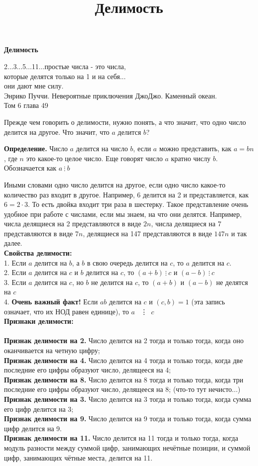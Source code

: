 \centerline{\bf \Huge Делимость}
\title{Делимость}
\begin{flushright}
    \scriptsize{2...3...5...11...простые числа - это числа,\\ которые делятся только на 1 и на себя... \\они дают мне силу.\\ Энрико Пуччи. Невероятные приключения ДжоДжо. Каменный океан.\\Том 6 глава 49}
\end{flushright}
Прежде чем говорить о делимости, нужно понять, а что значит, что одно число делится на другое. Что значит, что $a$ делится $b$? 

\textbf{Определение.} Число $a$ делится на число $b$, если $a$ можно представить, как $a=bn$, где $n$ это какое-то целое число. Еще говорят число $a$ кратно числу $b$. Обозначается как $a \ \vdots \ b$

Иными словами одно число делится на другое, если одно число какое-то количество раз входит в другое. Например, 6 делится на 2 и представляется, как $6 = 2 \cdot 3$. То есть двойка входит три раза в шестерку. Такое представление очень удобное при работе с числами, если мы знаем, на что они делятся. Например, числа делящиеся на 2 представляются в виде $2n$, числа делящиеся на 7 представляются в виде $7n$, делящиеся на 147 представляются в виде $147n$ и так далее.\\

\noindent\textbf{\Large Свойства делимости:}\\
1. Если $a$ делится на $b$, а $b$ в свою очередь делится на $c$, то $a$ делится на $c$.\\
2. Если $a$ делится на $c$ и $b$ делится на $c$, то $(a+b) \ \vdots \ c$ и $(a-b) \ \vdots \ c$\\
3. Если $a$ делится на $c$, но $b$ не делится на $c$, то $(a+b)$ и $(a-b)$ не делятся на $c$\\
4. \textbf{Очень важный факт!} Если $ab$ делится на $c$ и $(c,b)=1$ (эта запись означает, что их НОД равен единице), то $a$ \ \vdots \ $c$ \\

\noindent\textbf{\Large Признаки делимости:}\\ 
\\
\textbf{Признак делимости на 2.} Число делится на 2 тогда и только тогда, когда оно оканчивается на четную цифру;\\
\textbf{Признак делимости на 4.} Число делится на 4 тогда и только тогда, когда две последние его цифры образуют число, делящееся на 4;\\
\textbf{Признак делимости на 8.} Число делится на 8 тогда и только тогда, когда три последние его цифры образуют число, делящееся на 8; (что-то тут нечисто...)
\newpage
\noindent \textbf{Признак делимости на 3.} Число делится на 3 тогда и только тогда, когда сумма его цифр делится на 3;\\
\textbf{Признак делимости на 9.} Число делится на 9 тогда и только тогда, когда сумма цифр делится на 9.\\
\textbf{Признак делимости на 11.} Число делится на 11 тогда и только тогда, когда модуль разности между суммой цифр, занимающих нечётные позиции, и суммой цифр, занимающих чётные места, делится на 11.

